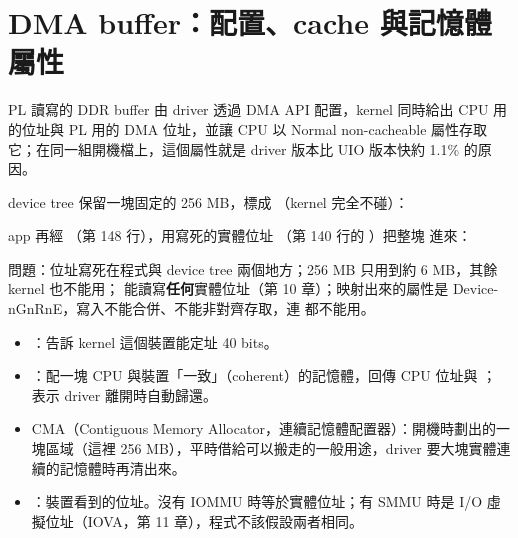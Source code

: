 \section{DMA buffer：配置、cache 與記憶體屬性}
\label{sec:dma}

\begin{oneline}
PL 讀寫的 DDR buffer 由 driver 透過 DMA API 配置，kernel 同時給出 CPU 用的位址與 PL 用的 DMA 位址，並讓 CPU 以 Normal non-cacheable 屬性存取它；在同一組開機檔上，這個屬性就是 driver 版本比 UIO 版本快約 1.1\% 的原因。
\end{oneline}

\begin{before}
device tree 保留一塊固定的 256 MB，標成 （kernel 完全不碰）：


app 再經 （第 148 行），用寫死的實體位址 （第 140 行的 ）把整塊  進來：


問題：位址寫死在程式與 device tree 兩個地方；256 MB 只用到約 6 MB，其餘 kernel 也不能用； 能讀寫\textbf{任何}實體位址（第 10 章）；映射出來的屬性是 Device-nGnRnE，寫入不能合併、不能非對齊存取，連  都不能用。
\end{before}

\begin{tech}
\begin{itemize}
\item {}：告訴 kernel 這個裝置能定址 40 bits。
\item {}：配一塊 CPU 與裝置「一致」（coherent）的記憶體，回傳 CPU 位址與 ； 表示 driver 離開時自動歸還。
\item CMA（Contiguous Memory Allocator，連續記憶體配置器）：開機時劃出的一塊區域（這裡 256 MB），平時借給可以搬走的一般用途，driver 要大塊實體連續的記憶體時再清出來。
\item {}：裝置看到的位址。沒有 IOMMU 時等於實體位址；有 SMMU 時是 I/O 虛擬位址（IOVA，第 11 章），程式不該假設兩者相同。
\end{itemize}
\end{tech}

